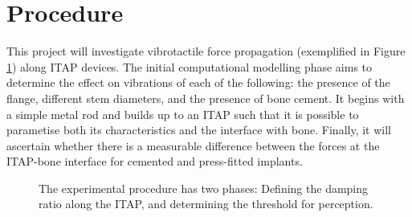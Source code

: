 \section{Procedure}
This project will investigate vibrotactile force propagation (exemplified in Figure \ref{fig:model-data}) along ITAP devices.
The initial computational modelling phase aims to determine the effect on vibrations of each of the following: the presence of the flange, different stem diameters, and the presence of bone cement.
It begins with a simple metal rod and builds up to an ITAP such that it is possible to parametise both its characteristics and the interface with bone.
Finally, it will ascertain whether there is a measurable difference between the forces at the ITAP-bone interface for cemented and press-fitted implants.

\begin{figure}[h]\centering
\caption{The experimental procedure has two phases: Defining the damping ratio along the ITAP, and determining the threshold for perception.}
\label{fig:model-data}
\end{figure}

